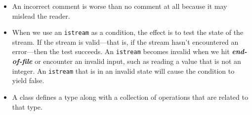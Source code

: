 \begin{itemize}
\item
An incorrect comment is worse than no comment at all because it may mislead the reader.

\item
When we use an \texttt{istream} as a condition, the effect is to test the state of the stream. If the stream is valid---that is, if the stream hasn't encountered an error---then the test succeeds. An \texttt{istream} becomes invalid when we hit \textbf{\textit{end-of-file}} or encounter an invalid input, such as reading a value that is not an integer. An \texttt{istream} that is in an invalid state will cause the condition to yield false.

\item
A class defines a type along with a collection of operations that are related to that type.

\end{itemize}